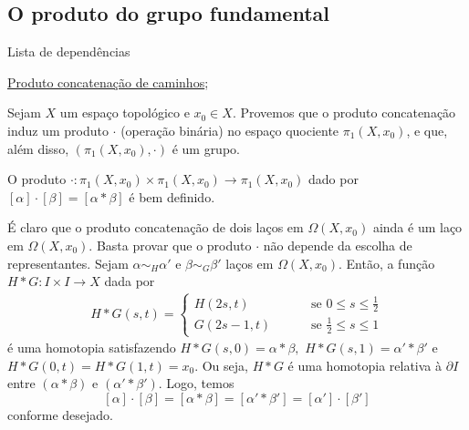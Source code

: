\subsection{O produto do grupo fundamental} %
\label{produto-bem-definido-prop}
\begin{titlemize}{Lista de dependências}
	\item \hyperref[Produto-concatenacao-def]{Produto concatenação de caminhos};\\ %
\end{titlemize}
Sejam $X$ um espaço topológico e $x_0\in X$. Provemos que o produto concatenação induz um produto $\cdot$ (operação binária) no espaço quociente $\pi_1(X,x_0)$, e que, além disso, $(\pi_1(X,x_0),\cdot)$ é um grupo.

\begin{lemma}%
    O produto $\cdot:\pi_1(X,x_0)\times\pi_1(X,x_0)\rightarrow \pi_1(X,x_0)$ dado por $[\alpha]\cdot[\beta]=[\alpha*\beta]$ é bem definido.
\end{lemma}

\begin{dem}
    É claro que o produto concatenação de dois laços em $\Omega(X,x_0)$ ainda é um laço em $\Omega(X,x_0)$. Basta provar que o produto $\cdot$ não depende da escolha de representantes. Sejam $\alpha\sim_H \alpha'$ e $\beta\sim_G\beta'$ laços em $\Omega(X,x_0)$. Então, a função $H*G:I\times I\rightarrow X$ dada por 
    \begin{align*}
        H*G(s,t)=\begin{cases}
            H(2s,t)\qquad&\mbox{ se }0\le s\le \frac{1}{2}\\
            G(2s-1,t)\qquad&\mbox{ se }\frac{1}{2}\le s\le1
        \end{cases}
    \end{align*}
    é uma homotopia satisfazendo $H*G(s,0)=\alpha*\beta,$ $H*G(s,1)=\alpha'*\beta'$ e $H*G(0,t)=H*G(1,t)=x_0$. Ou seja, $H*G$ é uma homotopia relativa à $\partial I$ entre $(\alpha*\beta)$ e $(\alpha'*\beta').$ Logo, temos  
    $$[\alpha]\cdot[\beta]=[\alpha*\beta]=[\alpha'*\beta']=[\alpha']\cdot [\beta']$$
    conforme desejado.
\end{dem}

